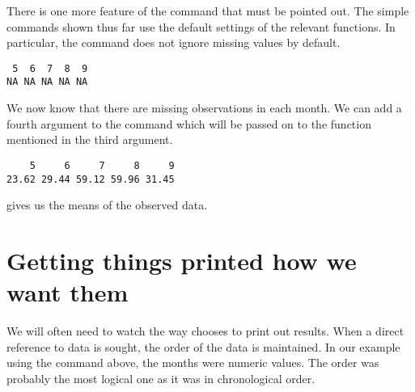 There is one more feature of the  command that must be pointed out. The simple commands shown thus far use the default settings of the relevant functions. In particular, the  command does not ignore missing values by default. 
\begin{knitrout}
\color{fgcolor}\begin{kframe}
\begin{alltt}
\hlstd{> }
\end{alltt}
\begin{verbatim}
 5  6  7  8  9 
NA NA NA NA NA 
\end{verbatim}
\end{kframe}
\end{knitrout}
We now know that there are missing  observations in each month. We can add a fourth argument to the command which will be passed on to the function mentioned in the third argument. 
\begin{knitrout}
\color{fgcolor}\begin{kframe}
\begin{alltt}
\hlstd{> } \hlstd{=}\hlstd{)}
\end{alltt}
\begin{verbatim}
    5     6     7     8     9 
23.62 29.44 59.12 59.96 31.45 
\end{verbatim}
\end{kframe}
\end{knitrout}
gives us the means of the observed data. 
 
\section{Getting things printed how we want them} 
 
We will often need to watch the way \R{} chooses to print out results. When a direct reference to data is sought, the order of the data is maintained. In our example using the  command above, the months were numeric values. The order was probably the most logical one as it was in chronological order. 
 

